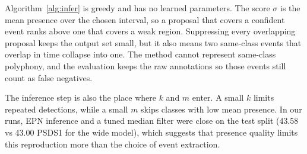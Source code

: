 Algorithm~\ref{alg:infer} is greedy and has no learned parameters. The score
$\sigma$ is the mean presence over the chosen interval, so a proposal that
covers a confident event ranks above one that covers a weak region. Suppressing
every overlapping proposal keeps the output set small, but it also means two
same-class events that overlap in time collapse into one. The method cannot
represent same-class polyphony, and the evaluation keeps the raw annotations so
those events still count as false negatives.

The inference step is also the place where $k$ and $m$ enter. A small $k$
limits repeated detections, while a small $m$ skips classes with low mean
presence. In our runs, EPN inference and a tuned median filter were close on
the test split (43.58 vs 43.00 PSDS1 for the wide model), which suggests that
presence quality limits this reproduction more than the choice of event
extraction.
